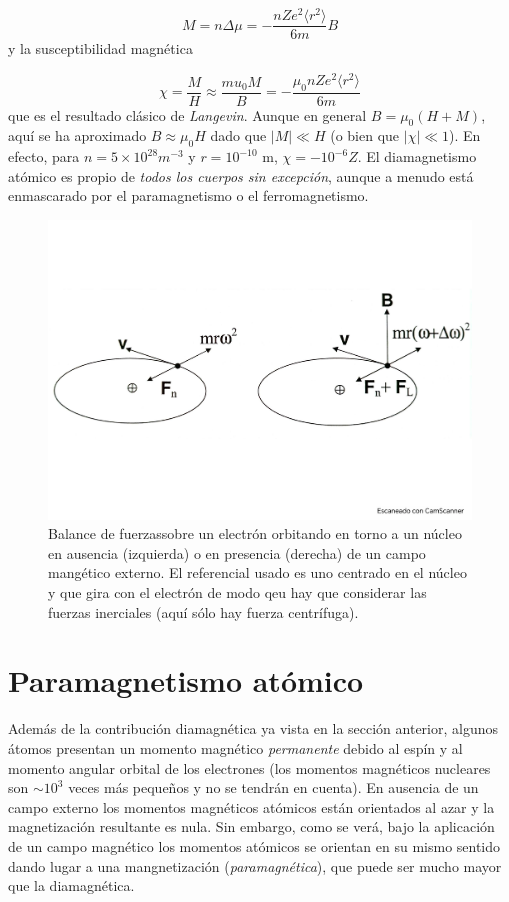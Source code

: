 \begin{equation}
	M = n \Delta \mu = - \frac{nZe^2 \langle r^2 \rangle}{6m}B
\end{equation}
y la susceptibilidad magnética 

\begin{equation}
	\chi = \frac{M}{H} \approx \frac{mu_0 M}{B} = - \frac{\mu_0 n Z e^2 \langle r^2 \rangle}{6m}
\end{equation}
que es el resultado clásico de \textit{Langevin}. Aunque en general $B=\mu_0 (H+M)$, aquí se ha aproximado $B\approx \mu_0 H$ dado que $|M|\ll H$ (o bien que $|\chi |\ll 1$). En efecto, para $n=5\times10^{28} \unit{m}^{-3}$ y $r=10^{-10}$ m, $\chi = -10^{-6}Z$. El diamagnetismo atómico es propio de \textit{todos los cuerpos sin excepción}, aunque a menudo está enmascarado por el paramagnetismo o el ferromagnetismo.

\begin{figure}[h!] \centering
	\includegraphics[scale=0.35]{Cuerpo/Ch_10/Fotos libro 1.pdf}
	\caption{Balance  de fuerzassobre un electrón orbitando en torno a un núcleo en ausencia (izquierda) o en presencia (derecha) de un campo mangético externo. El referencial usado es uno centrado en el núcleo y que gira con el electrón de modo qeu hay que considerar las fuerzas inerciales (aquí sólo hay fuerza centrífuga).}
	\label{Fig:10-01}
\end{figure}

\section{Paramagnetismo atómico}

Además de la contribución diamagnética ya vista en la sección anterior, algunos átomos presentan un momento magnético \textit{permanente} debido al espín y al momento angular orbital de los electrones (los momentos magnéticos nucleares son $\sim 10^3$ veces más pequeños y no se tendrán en cuenta). En ausencia de un campo externo los momentos magnéticos atómicos están orientados al azar y la magnetización resultante es nula. Sin embargo, como se verá, bajo la aplicación de un campo magnético los momentos atómicos se orientan en su mismo sentido dando lugar a una mangnetización (\textit{paramagnética}), que puede ser mucho mayor que la diamagnética.

